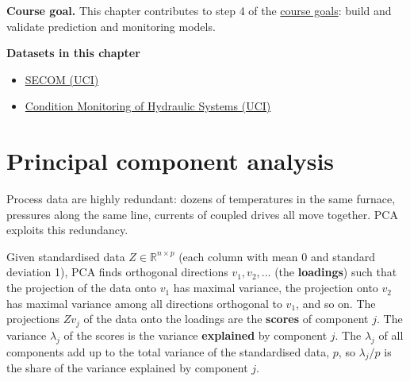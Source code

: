\documentclass[
  letterpaper,
  DIV=11,
  numbers=noendperiod]{scrreprt}
\providecommand{\tightlist}{%
  \setlength{\itemsep}{0pt}\setlength{\parskip}{0pt}}\usepackage{longtable,booktabs,array}
\begin{document}
\textbf{Course goal.} This chapter contributes to step 4 of the
\hyperref[what-you-will-be-able-to-do]{course goals}: build and validate
prediction and monitoring models.

\textbf{Datasets in this chapter}

\begin{itemize}
\tightlist
\item
  \href{https://archive.ics.uci.edu/dataset/179/secom}{SECOM (UCI)}
\item
  \href{https://archive.ics.uci.edu/dataset/447/condition+monitoring+of+hydraulic+systems}{Condition
  Monitoring of Hydraulic Systems (UCI)}
\end{itemize}

\section{Principal component
analysis}\label{principal-component-analysis}

Process data are highly redundant: dozens of temperatures in the same
furnace, pressures along the same line, currents of coupled drives all
move together. PCA exploits this redundancy.

\begin{tcolorbox}[enhanced jigsaw, left=2mm, title=\textcolor{quarto-callout-note-color}{\faInfo}\hspace{0.5em}{Definition: Principal component analysis (PCA)}, opacityback=0, breakable, rightrule=.15mm, arc=.35mm, toptitle=1mm, colbacktitle=quarto-callout-note-color!10!white, opacitybacktitle=0.6, coltitle=black, colframe=quarto-callout-note-color-frame, bottomrule=.15mm, leftrule=.75mm, bottomtitle=1mm, titlerule=0mm, toprule=.15mm, colback=white]

Given standardised data \(Z \in \mathbb{R}^{n \times p}\) (each column
with mean 0 and standard deviation 1), PCA finds orthogonal directions
\(v_1, v_2, \dots\) (the \textbf{loadings}) such that the projection of
the data onto \(v_1\) has maximal variance, the projection onto \(v_2\)
has maximal variance among all directions orthogonal to \(v_1\), and so
on. The projections \(Z v_j\) of the data onto the loadings are the
\textbf{scores} of component \(j\). The variance \(\lambda_j\) of the
scores is the variance \textbf{explained} by component \(j\). The
\(\lambda_j\) of all components add up to the total variance of the
standardised data, \(p\), so \(\lambda_j / p\) is the share of the
variance explained by component \(j\).

\end{tcolorbox}
\end{document}
